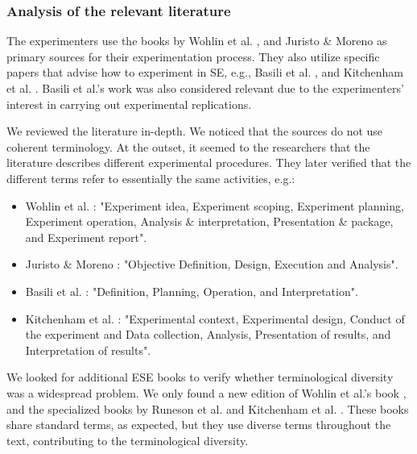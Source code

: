 \subsubsection{Analysis of the relevant literature}
The experimenters use the books by Wohlin et al. \cite{Wohlin-2000-Experimentation-SE}, and Juristo \& Moreno \cite{Juristo-2001-SE-experimentation} as primary sources for their experimentation process. They also utilize specific papers that advise how to experiment in SE, e.g., Basili et al. \cite{Basili-1986-ESE}, and Kitchenham et al. \cite{Kitchenham-2002-empirical-research-guidelines-SE}. Basili et al.'s work \cite{Basili-1999-families-experiments} was also considered relevant due to the experimenters' interest in carrying out experimental replications.

We reviewed the literature in-depth. We noticed that the sources do not use coherent terminology. At the outset, it seemed to the researchers that the literature describes different experimental procedures. They later verified that the different terms refer to essentially the same activities, e.g.:

\begin{itemize}
	\item Wohlin et al. \cite{Wohlin-2000-Experimentation-SE}: "Experiment idea, Experiment scoping, Experiment planning, Experiment operation, Analysis \& interpretation, Presentation \& package, and Experiment report".
	\item Juristo \& Moreno \cite{Juristo-2001-SE-experimentation}: "Objective Definition, Design, Execution and Analysis".
	\item Basili et al. \cite{Basili-1986-ESE}: "Definition, Planning, Operation, and Interpretation".
	\item Kitchenham et al. \cite{Kitchenham-2002-empirical-research-guidelines-SE}: "Experimental context, Experimental design, Conduct of the experiment and Data collection, Analysis, Presentation of results, and Interpretation of results".
\end{itemize}

We looked for additional ESE books to verify whether terminological diversity was a widespread problem. We only found a new edition of Wohlin et al.'s book \cite {Wohlin-2012-experimentatio-SE}, and the specialized books by Runeson et al. \cite{Runenson-2012-case-study-SE} and Kitchenham et al. \cite{Kitchenham-2015-Evidence-Based-SE}. These books share standard terms, as expected, but they use diverse terms throughout the text, contributing to the terminological diversity.

